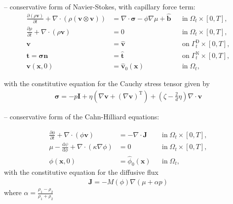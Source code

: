 \documentclass[a4paper,12pt]{report}
\newcommand{\Om}{\mathit{\Omega}}
\newcommand{\Gm}{\mathit{\Gamma}}
\begin{document}
-- conservative form of Navier-Stokes, with capillary force term:
\begin{equation}
\label{equation-fluid-multi-strong-form}
\begin{aligned}
\frac{\partial(\rho\boldsymbol{v})}{\partial t} + \nabla\cdot(\rho(\boldsymbol{v}\otimes\boldsymbol{v})) &= \nabla \cdot \boldsymbol{\sigma} -\phi\nabla\mu + \hat{\boldsymbol{b}} &&\text{in} \; \mathit{\Om}_t \times [0, T], \\
\frac{\partial\rho}{\partial t} + \nabla\cdot(\rho\boldsymbol{v}) &= 0 &&\text{in} \; \mathit{\Om}_t \times [0, T],\\
\boldsymbol{v} &= \hat{\boldsymbol{v}} &&\text{on} \; \mathit{\Gm}_t^{\mathrm{D}} \times [0, T],\\
\boldsymbol{t} = \boldsymbol{\sigma}\boldsymbol{n} &= \hat{\boldsymbol{t}} &&\text{on} \; \mathit{\Gm}_t^{\mathrm{N}} \times [0, T],\\
\boldsymbol{v}(\boldsymbol{x},0) &= \hat{\boldsymbol{v}}_{0}(\boldsymbol{x}) &&\text{in} \; \mathit{\Om}_t,
\end{aligned}
\end{equation}

with the constitutive equation for the Cauchy stress tensor given by
\begin{align}
\boldsymbol{\sigma} = -p \boldsymbol{I} + \eta \left(\nabla \boldsymbol{v} + (\nabla \boldsymbol{v})^{\mathrm{T}}\right) + \left(\zeta - \frac{2}{d}\eta\right)\nabla\cdot\boldsymbol{v}
\end{align}

-- conservative form of the Cahn-Hilliard equations:

\begin{equation}
\label{equation-cahnhilliard-strong-form}
\begin{aligned}
\frac{\partial \phi}{\partial t} + \nabla\cdot(\phi\boldsymbol{v}) &= - \nabla\cdot\boldsymbol{J} &&\text{in} \; \mathit{\Om}_t \times [0, T], \\
\mu - \frac{\mathrm{d}\psi}{\mathrm{d}\phi} + \nabla\cdot(\kappa \nabla \phi) &= 0 &&\text{in} \; \mathit{\Om}_t \times [0, T],\\
\phi(\boldsymbol{x},0) &= \hat{\phi}_{0}(\boldsymbol{x}) &&\text{in} \; \mathit{\Om}_t,
\end{aligned}
\end{equation}
with the constitutive equation for the diffusive flux
\begin{align}
\boldsymbol{J} = -M(\phi)\nabla(\mu + \alpha p)
\end{align}
where $\alpha=\frac{\rho_1-\rho_2}{\rho_1+\rho_2}$\\
\end{document}

